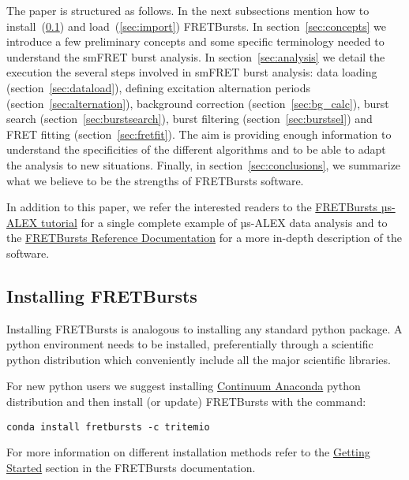 The paper is structured as follows. 
In the next subsections mention how to install~(\ref{sec:install}) and 
load~(\ref{sec:import}) FRETBursts.
In section~\ref{sec:concepts} we
introduce a few preliminary concepts and some specific terminology needed 
to understand the smFRET burst analysis. 
In section~\ref{sec:analysis} we detail the execution the several steps involved
in smFRET burst analysis: data loading (section~\ref{sec:dataload}), defining 
excitation alternation periods (section~\ref{sec:alternation}), background 
correction (section~\ref{sec:bg_calc}), burst search (section~\ref{sec:burstsearch}), 
burst filtering (section~\ref{sec:burstsel}) and FRET fitting (section~\ref{sec:fretfit}).
The aim is providing enough information to understand the specificities of 
the different algorithms and to be able to adapt the analysis to new situations.
Finally, in section~\ref{sec:conclusions}, we summarize what we believe to be
the strengths of FRETBursts software.

In addition to this paper, we refer the interested readers to the 
\href{http://nbviewer.ipython.org/github/tritemio/FRETBursts_notebooks/blob/master/notebooks/FRETBursts\%20-\%20us-ALEX\%20smFRET\%20burst\%20analysis.ipynb}{FRETBursts µs-ALEX tutorial} 
for a single complete example of µs-ALEX data analysis and to the
\href{http://fretbursts.readthedocs.org/}{FRETBursts Reference Documentation}
for a more in-depth description of the software.

\subsection{Installing FRETBursts}
\label{sec:install}
Installing FRETBursts is analogous to installing any standard python
package. A python environment needs to be installed, preferentially
through a scientific python distribution which conveniently include 
all the major scientific libraries.

For new python users we suggest installing 
\href{https://store.continuum.io/cshop/anaconda/}{Continuum Anaconda}
python distribution and then install (or update) FRETBursts with the command:

\begin{verbatim}
conda install fretbursts -c tritemio
\end{verbatim}

For more information on different installation methods refer to the 
\href{http://fretbursts.readthedocs.org/en/latest/getting_started.html}{Getting Started}
section in the FRETBursts documentation.

